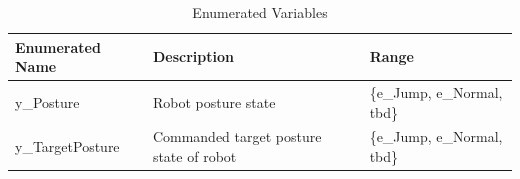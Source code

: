\documentclass[12pt]{article}
\begin{document}
        \begin{table}[H]
            \caption{Enumerated Variables}
            \begin{tabularx}{\textwidth}{|p{3cm}|X|X|}
                \toprule
                \textbf{Enumerated Name} & \textbf{Description} & \textbf{Range}                         \\
                \midrule
                y\_Posture               & Robot posture state  & \{e\_Jump, e\_Normal, \acrshort{tbd}\} \\
                y\_TargetPosture              & Commanded target posture state of robot  & \{e\_Jump, e\_Normal, \acrshort{tbd}\} \\
                
                
                \bottomrule
            \end{tabularx}
        \end{table}
    
\end{document}
